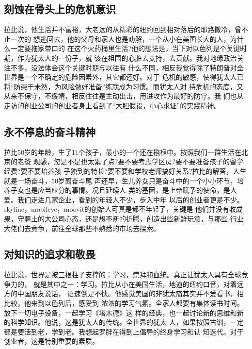 \documentclass[11pt]{ctexart}
\begin{document}
{{{{\subsection{刻蚀在骨头上的危机意识}
\label{sec:orgbfd0f9a}

拉比说，他生活并不富裕，大老远的从精彩的纽约回到相对落后的耶路撒冷，曾不止一次的
想逃回去，他的父母和家人也是劝解，一个从小在美国长大的人，为什么一定要拖家带口的
在这个火药桶里生活?他的想法是，当下对以色列是个关键时期，作为犹太人的一份子，就
该在祖国的心脏去支持，去贡献。我对地缘政治关注不多，没法体会这个关键时期与以往有
什么不同，相反我觉得除了特朗普对全世界是一个不确定的危险因素外，其它都还好。对于
危机的敏感，使得犹太人已将“防患于未然，为风险做好准备”练就成为习惯。而犹太人对
待危机的态度，又从来不保守，不绥靖，相反往往是主动出击，用进攻作为最好的防守。我
们也从走访的创业公司的创业者身上看到了“大胆假设，小心求证”的实践精神。

\subsection{永不停息的奋斗精神}
\label{sec:orgdcb5039}

拉比50岁的年龄，生了11个孩子，最小的一个还在襁褓中。按照我们一群生活在北京的老爸
观感，您是不是也太累了点?要不要考虑学区房?要不要准备孩子的留学经费?要不要培养孩
子独到的特长?要不要和学校老师搞好关系?拉比的解答，人生就是一场奋斗，50岁离奋斗尾
声还早，生儿养女只是奋斗中的一个小小环节，培养子女也是应当应分的事情。况且延续人
类的基因，是上帝赋予的使命，是大爱。我们走进几家企业，看到的年轻人不少，步入中年
以后的创业者更是不少。skyline，mobileye，moovit的创始人可真是都不年轻了，关键是
他们并没有收成果，守疆土的大公司心态，还是想不断的折腾，创造出些新鲜玩意，与那些
行业大佬们去竞争，前往全球那些不熟悉的市场去探索。

\subsection{对知识的追求和敬畏}
\label{sec:org4651305}

拉比说，世界是被三根柱子支撑的：学习，崇拜和血统。真正让犹太人具有全球竞争力的，
就是其中之一：学习。拉比从小在美国生活，地道的纽约口音，对着远方的中国朋友说话，
语速倒是不快。他感觉美国的非犹太裔其实并不爱看书，相比较，他来到以色列后，感受到
浓浓的学习气氛。全家人都要有集体读书时间。放下一切电子设备，一起学习《塔木德》这
样的经典，也一起讨论新的思维和新的科学知识。他说，这是犹太人的传统。全世界的犹太
人，如果按照古训，一定都是要活到老，学到老。我想起罗胖在得到上倡导的终身学习和认
知迭代。对于创业者，这是特别重要的素质。

}}}}
\end{document}

